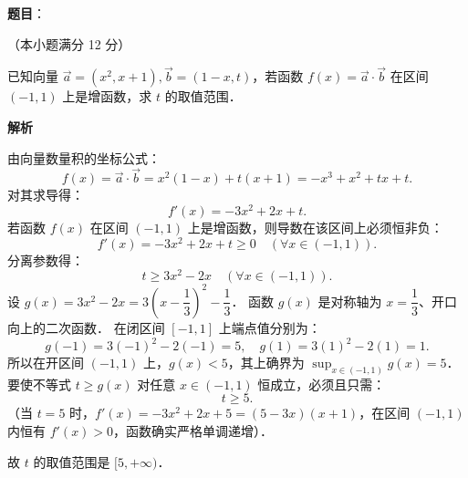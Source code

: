 \begin{answer}

\textbf{题目}：

（本小题满分 12 分）

已知向量 $\vec{a} = (x^2, x + 1), \vec{b} = (1 - x, t)$，若函数 $f(x) = \vec{a} \cdot \vec{b}$ 在区间 $(-1, 1)$ 上是增函数，求 $t$ 的取值范围．

\textbf{解析}

由向量数量积的坐标公式：
\nopagebreak[4]
\[
f(x) = \vec{a} \cdot \vec{b} = x^2(1 - x) + t(x + 1) = -x^3 + x^2 + tx + t.
\]
对其求导得：
\nopagebreak[4]
\[
f'(x) = -3x^2 + 2x + t.
\]
若函数 $f(x)$ 在区间 $(-1, 1)$ 上是增函数，则导数在该区间上必须恒非负：
\nopagebreak[4]
\[
f'(x) = -3x^2 + 2x + t \geqslant 0 \quad (\forall x \in (-1, 1)).
\]
分离参数得：
\nopagebreak[4]
\[
t \geqslant 3x^2 - 2x \quad (\forall x \in (-1, 1)).
\]
设 $g(x) = 3x^2 - 2x = 3\left(x - \dfrac{1}{3}\right)^2 - \dfrac{1}{3}$．
函数 $g(x)$ 是对称轴为 $x = \dfrac{1}{3}$、开口向上的二次函数．
在闭区间 $[-1, 1]$ 上端点值分别为：
\nopagebreak[4]
\[
g(-1) = 3(-1)^2 - 2(-1) = 5, \quad g(1) = 3(1)^2 - 2(1) = 1.
\]
所以在开区间 $(-1, 1)$ 上，$g(x) < 5$，其上确界为 $\sup_{x \in (-1, 1)} g(x) = 5$．
要使不等式 $t \geqslant g(x)$ 对任意 $x \in (-1, 1)$ 恒成立，必须且只需：
\nopagebreak[4]
\[
t \geqslant 5.
\]
（当 $t = 5$ 时，$f'(x) = -3x^2 + 2x + 5 = (5 - 3x)(x + 1)$，在区间 $(-1, 1)$ 内恒有 $f'(x) > 0$，函数确实严格单调递增）．

故 $t$ 的取值范围是 $[5, +\infty)$．

\gkanswer{答案：$[5, +\infty)$。}

\end{answer}
